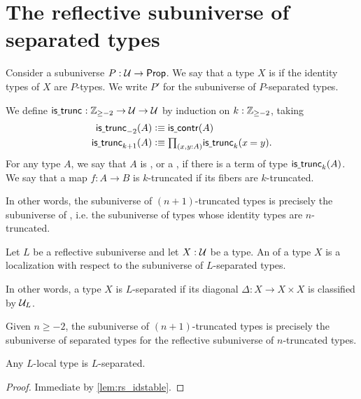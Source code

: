 \section{The reflective subuniverse of separated types}

\begin{defn}
Consider a subuniverse $P:\mathcal{U}\to\mathsf{Prop}$. We say that a type $X$ is  if the identity types of $X$ are $P$-types. We write $P'$ for the subuniverse of $P$-separated types.
\end{defn}

\begin{eg}
We define $\mathsf{is\underline{\ }{}trunc}_{} : \mathbb{Z}_{\geq-2}\to\mathcal{U}\to\mathcal{U}$ by induction on $k:\mathbb{Z}_{\geq -2}$, taking
\begin{align*}
\istrunc{-2}(A) & \defeq \iscontr(A) \\
\istrunc{k+1}(A) & \defeq \prd{x,y:A}\istrunc{k}(\id{x}{y}).\qedhere
\end{align*}
For any type $A$, we say that $A$ is , or a , if there is a term of type $\mathsf{is\underline{\ }{}trunc}_{k}(A)$. We say that a map $f:A\to B$ is $k$-truncated if its fibers are $k$-truncated.

In other words, the subuniverse of $(n+1)$-truncated types is precisely the subuniverse of , i.e. the subuniverse of types whose identity types are $n$-truncated.
\end{eg}

\begin{defn}
Let $L$ be a reflective subuniverse and let $X : \mathcal{U}$ be a type. 
An  of a type $X$ is a localization with respect to the subuniverse of $L$-separated types.
\end{defn}

In other words, a type $X$ is $L$-separated if its diagonal $\Delta:X\to X\times X$ is classified by $\mathcal{U}_L$.

\begin{eg}\label{example:truncationisseparated}
Given $n \geq -2$, the subuniverse of $(n+1)$-truncated types is precisely the subuniverse of separated types for the reflective subuniverse of $n$-truncated types.
\end{eg}

\begin{lem}
Any $L$-local type is $L$-separated.
\end{lem}

\begin{proof}
Immediate by \cref{lem:rs_idstable}.
\end{proof}

